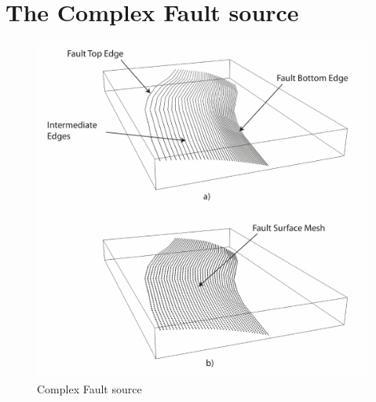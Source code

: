 \section{The Complex Fault source}
\begin{figure}
\centering
\includegraphics[width=14cm]{./Pictures/ComplexFault.pdf}
\caption{Complex Fault source}
\label{fig:ComplexFaultSource}
\end{figure}
%

